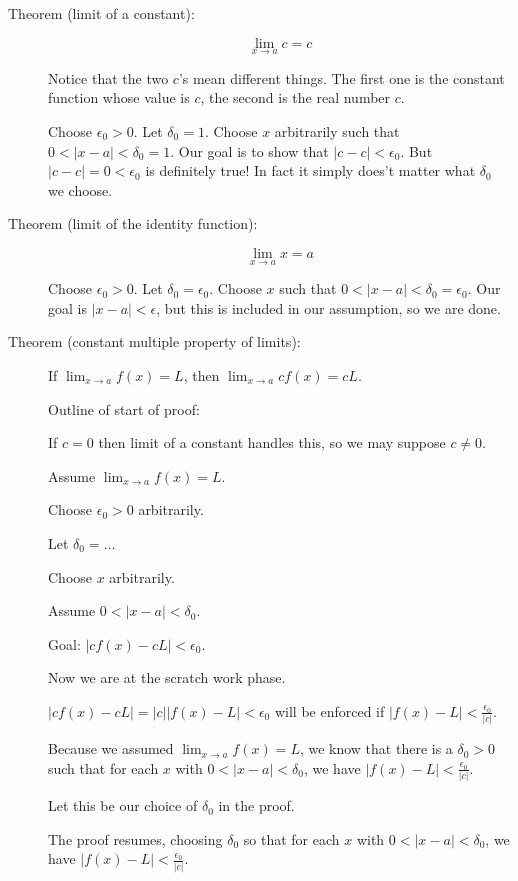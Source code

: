 \documentclass[12pt]{article}
\begin{document}
\begin{description}

\item[Theorem (limit of a constant):]  $$\lim_{x \rightarrow a} c=c$$

Notice that the two $c$'s mean different things.  The first one is the constant function whose value is $c$,
the second is the real number $c$.

Choose $\epsilon_0>0$.  Let $\delta_0=1$.  Choose $x$ arbitrarily such that $0<|x-a|<\delta_0=1$.
Our goal is to show that $|c-c|<\epsilon_0$.  But $|c-c|=0<\epsilon_0$ is definitely true!  In fact it simply
does't matter what $\delta_0$ we choose.

\item[Theorem (limit of the identity function):]  $$\lim_{x \rightarrow a} x=a$$

Choose $\epsilon_0>0$.  Let $\delta_0=\epsilon_0$.  Choose $x$ such that $0<|x-a|<\delta_0=\epsilon_0$.
Our goal is $|x-a|<\epsilon$, but this is included in our assumption, so we are done.

\item[Theorem (constant multiple property of limits):]  If $\lim_{x\rightarrow a} f(x)= L$, then $\lim_{x \rightarrow a} cf(x) = cL$.

Outline of start of proof:

If $c=0$ then limit of a constant handles this, so we may suppose $c \neq 0$.

Assume $\lim_{x\rightarrow a} f(x)= L$.

Choose $\epsilon_0>0$ arbitrarily.

Let $\delta_0 =\ldots$

Choose $x$ arbitrarily.

Assume $0<|x-a|<\delta_0$.

Goal:  $|cf(x)-cL|<\epsilon_0$.

Now we are at the scratch work phase.

$|cf(x)-cL|=|c||f(x)-L|<\epsilon_0$ will be enforced if $|f(x)-L|<\frac{\epsilon_0}{|c|}$.

Because we assumed $\lim_{x\rightarrow a} f(x)= L$, we know that there is a $\delta_0>0$ such that
for each $x$ with $0<|x-a|<\delta_0$, we have $|f(x)-L|<\frac{\epsilon_0}{|c|}$.

Let this be our choice of $\delta_0$ in the proof.

The proof resumes, choosing $\delta_0$ so that for each $x$ with $0<|x-a|<\delta_0$, we have $|f(x)-L|<\frac{\epsilon_0}{|c|}$.


\end{description}
\end{document}

